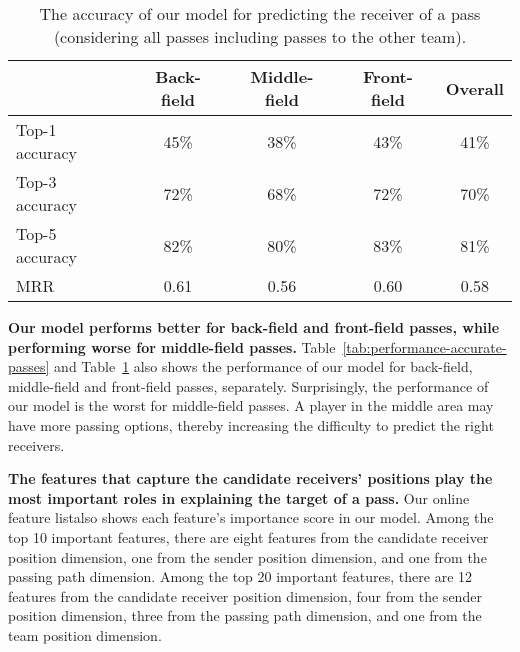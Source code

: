 \begin{table}[!t]
\vspace{-0.2cm}
\caption{The accuracy of our model for predicting the receiver of a pass (considering all passes including passes to the other team).}
\centering
\begin{tabular}{lcccc}
  \hline
  & Back-field & Middle-field & Front-field & Overall \\
  \hline
  Top-1 accuracy & 45\% & 38\% & 43\% & 41\% \\
  Top-3 accuracy & 72\% & 68\% & 72\% & 70\% \\
  Top-5 accuracy & 82\% & 80\% & 83\% & 81\% \\
  MRR & 0.61 & 0.56 & 0.60 & 0.58 \\
  \hline
\end{tabular}
\label{tab:performance-all-passes}
\vspace{-0.4cm}
\end{table}

\textbf{Our model performs better for back-field and front-field passes, while performing worse for middle-field passes.}
Table~\ref{tab:performance-accurate-passes} and Table~\ref{tab:performance-all-passes} also shows the performance of our model for back-field, middle-field and front-field passes, separately.
Surprisingly, the performance of our model is the worst for middle-field passes. A player in the middle area may have more passing options, thereby increasing the difficulty to predict the right receivers.

\textbf{The features that capture the candidate receivers' positions play the most important roles in explaining the target of a pass.}
Our online feature list\footnotemark[\ref{feature-list}] also shows each feature's importance score in our model.
Among the top 10 important features, there are eight features from the candidate receiver position dimension, one from the sender position dimension, and one from the passing path dimension.
Among the top 20 important features, there are 12 features from the candidate receiver position dimension, four from the sender position dimension, three from the passing path dimension, and one from the team position dimension.

\vspace{-0.4cm}
